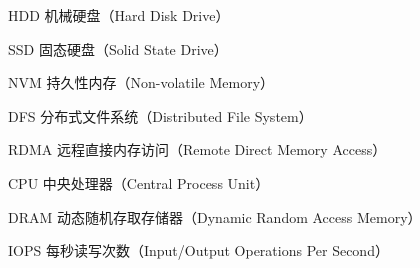 
\begin{denotation}[3cm]
\item[HDD]  机械硬盘（Hard Disk Drive）
\item[SSD]  固态硬盘（Solid State Drive）
\item[NVM]  持久性内存（Non-volatile Memory） 
\item[DFS]  分布式文件系统（Distributed File System）
\item[RDMA] 远程直接内存访问（Remote Direct Memory Access）
\item[CPU]  中央处理器（Central Process Unit）
\item[DRAM] 动态随机存取存储器（Dynamic Random Access Memory）
\item[IOPS] 每秒读写次数（Input/Output Operations Per Second）   
\end{denotation}
